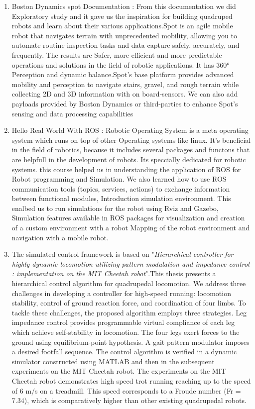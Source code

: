 \begin{enumerate}
    \item Boston Dynamics spot Documentation : From this documentation we did Exploratory study and it gave us the  inspiration for building quadruped robots and learn about their various applications.Spot is an agile mobile robot that navigates terrain with unprecedented mobility, allowing you to automate routine inspection tasks and data capture safely, accurately, and frequently. The results are Safer, more efficient and more predictable operations and solutions in the field of robotic applications. It has 360° Perception and dynamic balance.Spot’s base platform provides advanced mobility and perception to navigate stairs, gravel, and rough terrain while collecting 2D and 3D information with on board-sensors. We can also add payloads provided by Boston Dynamics or third-parties to enhance Spot’s sensing and data processing capabilities 

    \item Hello Real World With ROS : Robotic Operating System is a meta operating system which runs on top of other Operating systems like linux. It's beneficial in the field of robotics, because it includes several packages and functons that are helpfull in the development of robots. Its speccially dedicated for robotic systems. this course helped us in understanding the application of ROS for Robot programming and Simulation. We also learned how to use ROS communication tools (topics, services, actions) to exchange information between functional modules, Introduction simulation environment. This enalbed us to run simulations for the robot using Rviz and Gazebo, Simulation features available in ROS packages for visualization and creation of a custom environment with a robot
        Mapping of the robot environment and navigation with a mobile robot.

    \item The simulated control framework is based on "\emph{Hierarchical controller for highly dynamic locomotion utilizing pattern modulation and impedance control : implementation on the MIT Cheetah robot}".This thesis presents a hierarchical control algorithm for quadrupedal locomotion. We address three challenges in developing a controller for high-speed running: locomotion stability, control of ground reaction force, and coordination of four limbs. To tackle these challenges, the proposed algorithm employs three strategies. Leg impedance control provides programmable virtual compliance of each leg which achieve self-stability in locomotion. The four legs exert forces to the ground using equilibrium-point hypothesis. A gait pattern modulator imposes a desired footfall sequence. The control algorithm is verified in a dynamic simulator constructed using MATLAB and then in the subsequent experiments on the MIT Cheetah robot. The experiments on the MIT Cheetah robot demonstrates high speed trot running reaching up to the speed of 6 m/s on a treadmill. This speed corresponds to a Froude number (Fr = 7.34), which is comparatively higher than other existing quadrupedal robots.

\end{enumerate}